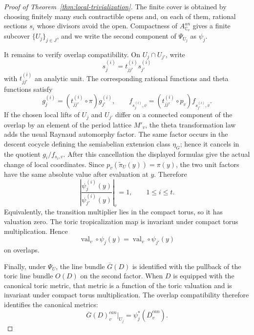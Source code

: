\documentclass[10pt,a4paper]{amsart}
\DeclareMathOperator{\val}{val}
\begin{document}
\begin{proof}[Proof of Theorem~\ref{thm:local-trivialization}]
	The finite cover is obtained by choosing finitely many such contractible opens
	and, on each of them, rational sections \(s_i\) whose divisors avoid the open.
	Compactness of \(A_{\mathbb C_v}^{an}\) gives a finite subcover
	\(\{U_j\}_{j\in J}\), and we write the second component of \(\Psi_{U_j}\) as
	\(\psi_j\).
	
	It remains to verify overlap compatibility.  On \(U_j\cap U_{j'}\), write
	\[
	s_j^{(i)}=t_{jj'}^{(i)}s_{j'}^{(i)}
	\]
	with \(t_{jj'}^{(i)}\) an analytic unit.  The corresponding rational functions
	and theta functions satisfy
	\[
	g_j^{(i)}=(t_{jj'}^{(i)}\circ\pi)g_{j'}^{(i)},\qquad
	f_{s_j^{(i)},v}=(t_{jj'}^{(i)}\circ p_v)f_{s_{j'}^{(i)},v}.
	\]
	If the chosen local lifts of \(U_j\) and \(U_{j'}\) differ on a connected
	component of the overlap by an element of the period lattice \(M'_v\), the
	theta transformation law adds the usual Raynaud automorphy factor.  The same
	factor occurs in the descent cocycle defining the semiabelian extension
	class \(\eta_G\); hence it cancels in the quotient
	\(g_i/f_{s_i,v}\).  After this cancellation the displayed formulas give the
	actual change of local coordinates.
	Since \(p_v(\widetilde\pi_U(y))=\pi(y)\), the two unit factors have the same
	absolute value after evaluation at \(y\).  Therefore
	\[
	\left|
	\frac{\psi_j^{(i)}(y)}{\psi_{j'}^{(i)}(y)}
	\right|_v=1,\qquad 1\le i\le t.
	\]
	Equivalently, the transition multiplier lies in the compact torus, so it has
	valuation zero.  The toric tropicalization map is invariant under compact
	torus multiplication.  Hence
	\[
	\val_v\circ\psi_j(y)=\val_v\circ\psi_{j'}(y)
	\]
	on overlaps.
	
	Finally, under \(\Psi_U\), the line bundle \(\overline G(D)\) is identified
	with the pullback of the toric line bundle \(O(D)\) on the second factor.  When
	\(D\) is equipped with the canonical toric metric, that metric is a function
	of the toric valuation and is invariant under compact torus multiplication.
	The overlap compatibility therefore identifies the canonical metrics:
	\[
	\overline G(D)^{can}_v|_{U_j}=\psi_j^*(\overline D^{can}_v).
	\]
\end{proof}
\end{document}

